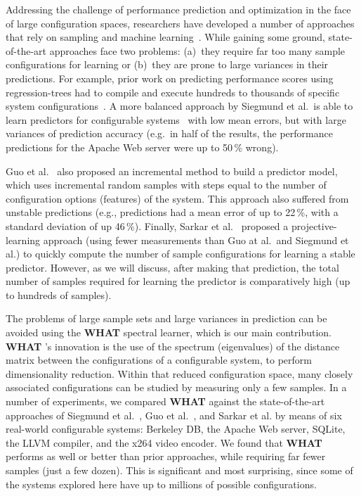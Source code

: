 \documentclass{newsig}
\newcommand{\what}{{\bf WHAT }}
\begin{document}
Addressing the challenge of performance prediction and optimization in the face of large configuration spaces, researchers have developed a number of approaches that rely on sampling and machine learning~\cite{siegmund2012predicting,guo2013variability,sarkar2015cost}.
While gaining some ground, state-of-the-art approaches face two problems: 
(a)~they require far too many sample configurations for learning or (b)~they are prone to large variances in their predictions. For example, prior work on predicting performance scores using regression-trees had to compile and execute hundreds to thousands of specific system configurations~\cite{guo2013variability}. 
A more balanced approach by Siegmund et al.\ is able to learn predictors for  configurable systems~\cite{siegmund2012predicting} with low mean errors, but with large variances of prediction accuracy  (e.g.\ in half of the results, the performance predictions for the Apache Web server were up to 50\,\% wrong). 
 
Guo et al.~\cite{guo2013variability} also proposed an incremental method to build a predictor model, which uses incremental random samples with steps equal to the number of configuration options (features) of the system. This approach also
suffered from  unstable predictions (e.g., predictions had a mean error of up to 22\,\%, with a standard deviation of up 46\,\%). Finally, Sarkar et al.~\cite{sarkar2015cost} proposed a proj\-ective-learning approach (using fewer measurements than Guo at al.\ and Siegmund et al.) to quickly compute  the number of sample configurations for learning a stable predictor. However, as we will discuss, after making that prediction, the total number of samples required for learning the predictor is comparatively high (up to hundreds of samples).

The problems of large sample sets and large variances in prediction can be avoided using the \what spectral learner, which is our main contribution.  
{\what}'s innovation is  the use of the spectrum (eigenvalues) of the distance matrix
between the configurations of a configurable system, to perform dimensionality reduction. Within that
reduced configuration space, many closely associated configurations can be studied
by measuring only a few samples.
In a number of experiments, we compared \what against the state-of-the-art approaches of Siegmund et al.~\cite{siegmund2012predicting}, Guo et al.~\cite{guo2013variability}, and Sarkar et al. \cite{sarkar2015cost} by means of six real-world configurable systems: Berkeley DB,  the Apache Web server, SQLite, the LLVM compiler, and the x264 video encoder.
We found that \what performs as well or better than prior approaches,
while  requiring far fewer samples (just a few dozen).
This is significant and most surprising, since some of the systems explored here have up to millions of possible configurations. 
 
\end{document}

